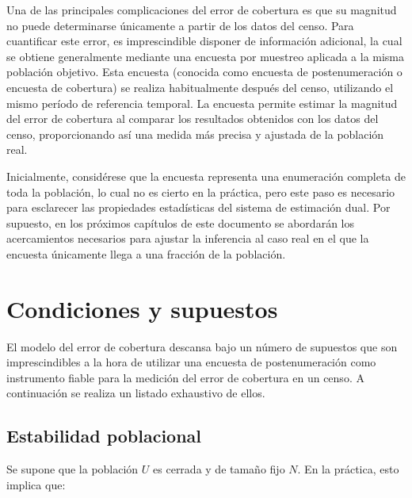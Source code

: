 \documentclass[
  12pt,
]{book}
\begin{document}
Una de las principales complicaciones del error de cobertura es que su magnitud no puede determinarse únicamente a partir de los datos del censo. Para cuantificar este error, es imprescindible disponer de información adicional, la cual se obtiene generalmente mediante una encuesta por muestreo aplicada a la misma población objetivo. Esta encuesta (conocida como encuesta de postenumeración o encuesta de cobertura) se realiza habitualmente después del censo, utilizando el mismo período de referencia temporal. La encuesta permite estimar la magnitud del error de cobertura al comparar los resultados obtenidos con los datos del censo, proporcionando así una medida más precisa y ajustada de la población real.

Inicialmente, considérese que la encuesta representa una enumeración completa de toda la población, lo cual no es cierto en la práctica, pero este paso es necesario para esclarecer las propiedades estadísticas del sistema de estimación dual. Por supuesto, en los próximos capítulos de este documento se abordarán los acercamientos necesarios para ajustar la inferencia al caso real en el que la encuesta únicamente llega a una fracción de la población.

\hypertarget{condiciones-y-supuestos}{%
\section{Condiciones y supuestos}\label{condiciones-y-supuestos}}

El modelo del error de cobertura descansa bajo un número de supuestos que son imprescindibles a la hora de utilizar una encuesta de postenumeración como instrumento fiable para la medición del error de cobertura en un censo. A continuación se realiza un listado exhaustivo de ellos.

\hypertarget{estabilidad-poblacional}{%
\subsection{Estabilidad poblacional}\label{estabilidad-poblacional}}

Se supone que la población \(U\) es cerrada y de tamaño fijo \(N\). En la práctica, esto implica que:
\end{document}
